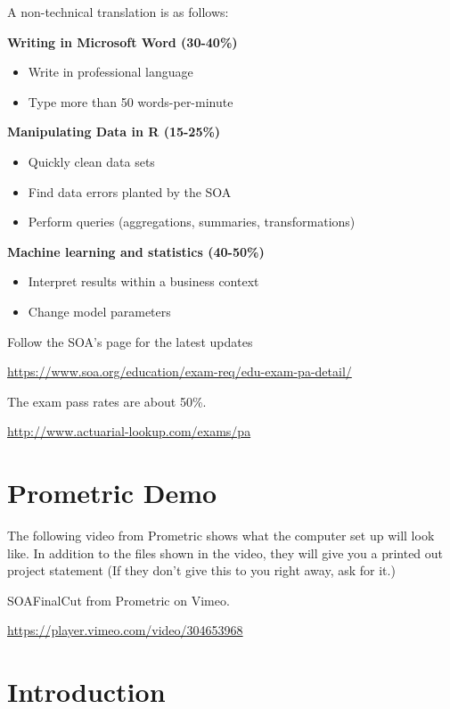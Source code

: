 \documentclass[
  openany]{book}
\providecommand{\tightlist}{%
  \setlength{\itemsep}{0pt}\setlength{\parskip}{0pt}}
\begin{document}
A non-technical translation is as follows:

\textbf{Writing in Microsoft Word (30-40\%)}

\begin{itemize}
\tightlist
\item
  Write in professional language
\item
  Type more than 50 words-per-minute
\end{itemize}

\textbf{Manipulating Data in R (15-25\%)}

\begin{itemize}
\tightlist
\item
  Quickly clean data sets
\item
  Find data errors planted by the SOA
\item
  Perform queries (aggregations, summaries, transformations)
\end{itemize}

\textbf{Machine learning and statistics (40-50\%)}

\begin{itemize}
\tightlist
\item
  Interpret results within a business context
\item
  Change model parameters
\end{itemize}

Follow the SOA's page for the latest updates

\url{https://www.soa.org/education/exam-req/edu-exam-pa-detail/}

The exam pass rates are about 50\%.

\url{http://www.actuarial-lookup.com/exams/pa}

\hypertarget{prometric-demo}{%
\chapter{Prometric Demo}\label{prometric-demo}}

The following video from Prometric shows what the computer set up will look like. In addition to the files shown in the video, they will give you a printed out project statement (If they don't give this to you right away, ask for it.)

SOAFinalCut from Prometric on Vimeo.

\url{https://player.vimeo.com/video/304653968}

\hypertarget{introduction}{%
\chapter{Introduction}\label{introduction}}
\end{document}
